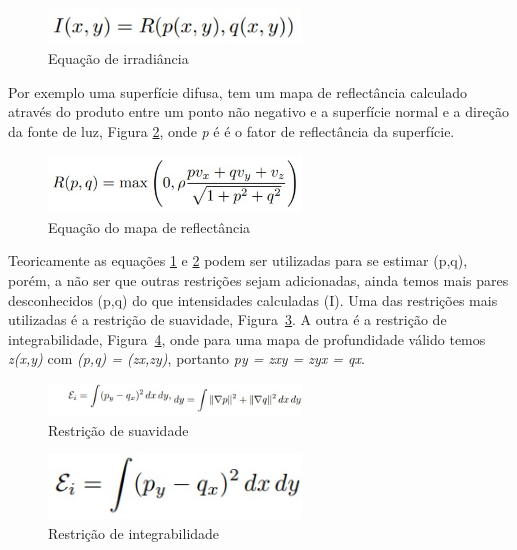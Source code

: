 \documentclass{article}
\begin{document}
\begin{figure}[!htb]
    \centering
    \includegraphics[width=0.60\textwidth]{equacao1.jpg}
    \caption{Equação de irradiância}
    \label{eq:irrad}
\end{figure}

Por exemplo uma superfície difusa, tem um mapa de reflectância calculado através do produto entre um ponto não negativo e a superfície normal e a direção da fonte de luz, Figura \ref{eq:mapareflec}, onde \textit{p} é é o fator de reflectância da superfície.

\begin{figure}[!htb]
    \centering
    \includegraphics[width=0.60\textwidth]{equacao2.jpg}
    \caption{Equação do mapa de reflectância}
    \label{eq:mapareflec}
\end{figure}

Teoricamente as equações \ref{eq:irrad} e \ref{eq:mapareflec} podem ser utilizadas para se estimar (p,q), porém,  a não ser que outras restrições sejam adicionadas, ainda temos mais pares desconhecidos (p,q) do que intensidades calculadas (I). Uma das restrições mais utilizadas é a restrição de suavidade, Figura~\ref{eq:suavidade}. A outra é a restrição de integrabilidade, Figura~\ref{eq:integrabilidade}, onde para uma mapa de profundidade válido temos \textit{z(x,y)} com \textit{(p,q) = (zx,zy)}, portanto \textit{py = zxy = zyx = qx}.

\begin{figure}[!htb]
    \centering
    \includegraphics[width=0.60\textwidth]{equacao3.jpg}
    \caption{Restrição de suavidade}
    \label{eq:suavidade}
\end{figure}

\begin{figure}[!htb]
    \centering
    \includegraphics[width=0.60\textwidth]{equacao4.jpg}
    \caption{Restrição de integrabilidade}
    \label{eq:integrabilidade}
\end{figure}
\end{document}
